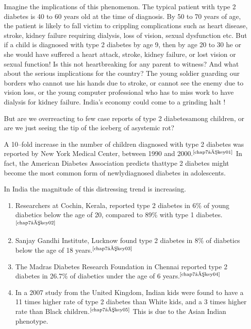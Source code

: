 Imagine the implications of this phenomenon. The typical patient with type 2 diabetes is 40 to 60 years old at the time of diagnosis. By 50 to 70 years of age, the patient is likely to fall victim to crippling compli\-cations such as heart disease, stroke, kidney failure requiring dialysis, loss of vision, sexual dysfunction etc. But if a child is dia\-gnosed with type 2 diabetes by age 9, then by age 20 to 30 he or she would have suffered a heart attack, stroke, kidney failure, or lost vision or sexual function! Is this not heartbreaking for any parent to witness? And what about the serious implications for the country? The young soldier gua\-rding our borders who cannot use his hands due to stroke, or cannot see the enemy due to vision loss, or the young computer professional who has to miss work to have dialysis for kidney failure. India’s eco\-nomy could come to a grinding halt !


But are we overreacting to few case reports of type 2 diabetes\break among children, or are we just seeing the tip of the iceberg of a\break systemic rot?

\setlength{\parskip}{.5em}
A 10–fold increase in the number of children diagnosed with type 2 diabetes was reported by New York Medical Center, between 1990 and 2000.$^{\text{\cite{chap7–key01}}}$ In fact, the American Diabetes Association predicts that\break type 2 diabetes might become the most common form of newly\break diagnosed diabetes in adolescents.

\noindent In India the magnitude of this distressing trend is increasing.

\begin{enumerate}[•]
\itemsep=0pt
\item Researchers at Cochin, Kerala, reported type 2 diabetes in 6\% of young diabetics below the age of 20, compared to 89\% with type 1 diabetes.$^{\text{\cite{chap7–key02}}}$
\item Sanjay Gandhi Institute, Lucknow found type 2 diabetes in 8\% of dia\-betics below the age of 18 years.$^{\text{\cite{chap7–key03}}}$
\item The Madras Diabetes Research Foundation in Chennai reported type 2 diabetes in 26.7\% of diabetics under the age of 6 years.$^{\text{\cite{chap7–key04}}}$
\item In a 2007 study from the United Kingdom, Indian kids were found to have a 11 times higher rate of type 2 diabetes than White kids, and a 3 times higher rate than Black children.$^{\text{\cite{chap7–key05}}}$ This is due to the Asian Indian phenotype.
 \end{enumerate}


